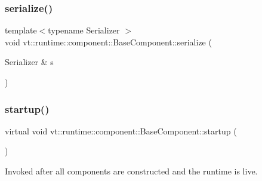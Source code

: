 \subsubsection{\texorpdfstring{serialize()}{serialize()}}
{\footnotesize\ttfamily template$<$typename Serializer $>$ \\
void vt\+::runtime\+::component\+::\+Base\+Component\+::serialize (\begin{DoxyParamCaption}\item[{Serializer \&}]{s }\end{DoxyParamCaption})\hspace{0.3cm}{\ttfamily [inline]}}

\mbox{\label{structvt_1_1runtime_1_1component_1_1_base_component_a8bf92f9f0a7027abf7deaefa2e7f5202}} 
\subsubsection{\texorpdfstring{startup()}{startup()}}
{\footnotesize\ttfamily virtual void vt\+::runtime\+::component\+::\+Base\+Component\+::startup (\begin{DoxyParamCaption}{ }\end{DoxyParamCaption})\hspace{0.3cm}{\ttfamily [pure virtual]}}



Invoked after all components are constructed and the runtime is live. 



